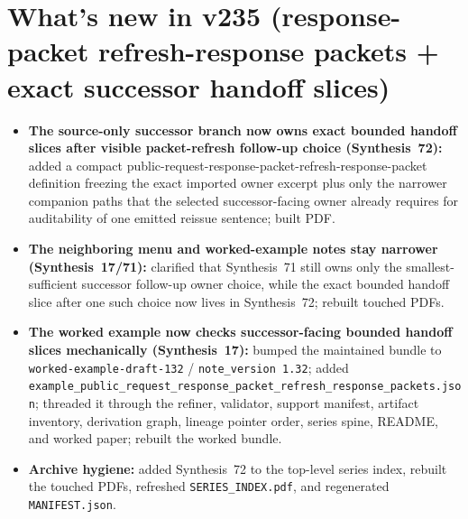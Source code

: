 \documentclass[11pt]{article}
\begin{document}
\section{What's new in v235 (response-packet refresh-response packets + exact successor handoff slices)}
\begin{itemize}[leftmargin=*]
\item \textbf{The source-only successor branch now owns exact bounded handoff slices after visible packet-refresh follow-up choice (Synthesis~72):} added a compact public-request-response-packet-refresh-response-packet definition freezing the exact imported owner excerpt plus only the narrower companion paths that the selected successor-facing owner already requires for auditability of one emitted reissue sentence; built PDF.
\item \textbf{The neighboring menu and worked-example notes stay narrower (Synthesis~17/71):} clarified that Synthesis~71 still owns only the smallest-sufficient successor follow-up owner choice, while the exact bounded handoff slice after one such choice now lives in Synthesis~72; rebuilt touched PDFs.
\item \textbf{The worked example now checks successor-facing bounded handoff slices mechanically (Synthesis~17):} bumped the maintained bundle to \texttt{worked-example-draft-132} / \texttt{note\_version 1.32}; added \texttt{example\_public\_request\_response\_packet\_refresh\_response\_packets.json}; threaded it through the refiner, validator, support manifest, artifact inventory, derivation graph, lineage pointer order, series spine, README, and worked paper; rebuilt the worked bundle.
\item \textbf{Archive hygiene:} added Synthesis~72 to the top-level series index, rebuilt the touched PDFs, refreshed \texttt{SERIES\_INDEX.pdf}, and regenerated \texttt{MANIFEST.json}.
\end{itemize}
\end{document}
